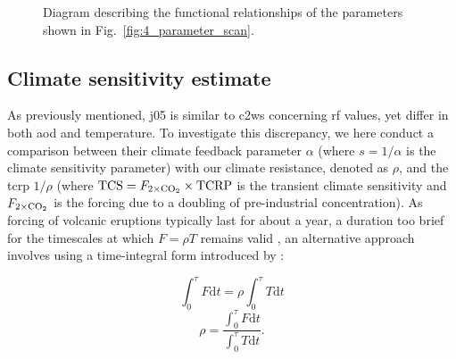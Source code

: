 \documentclass{ametsocV6.1}
\begin{document}
\begin{figure}
  \centering


  \caption{Diagram describing the functional relationships of the parameters shown in
    Fig.~\ref{fig:4_parameter_scan}.}\label{fig:5_diagram_of_function_relations}%
\end{figure}

\subsection{Climate sensitivity estimate}

As previously mentioned, \gls{j05} is similar to \gls{c2ws} concerning \gls{rf} values,
yet differ in both \gls{aod} and temperature. To investigate this discrepancy, we here
conduct a comparison between their climate feedback parameter \(\alpha \) (where
\(s=1/\alpha \) is the climate sensitivity parameter) with our climate resistance,
denoted as \(\rho \), and the \gls{tcrp} \(1/\rho\) (where
\(\mathrm{TCS}=F_{2\times\ce{CO2}}\times \mathrm{TCRP}\) is the transient climate
sensitivity and \(F_{2\times\ce{CO2}}\) is the forcing due to a doubling of
pre-industrial  concentration). As forcing of volcanic eruptions typically last
for about a year, a duration too brief for the timescales at which \(F=\rho T\) remains
valid \citep{gregory2016}, an alternative approach involves using a time-integral form
introduced by \citet{merlis2014}:

\begin{equation}
  \int_0^{\tau}F \mathrm{d}t=\rho\int_{0}^{\tau}T \mathrm{d}t
  \label{eq:climate-resistance-orig}
\end{equation}
\begin{equation}
  \rho=\frac{\int_0^{\tau}F \mathrm{d}t}{\int_{0}^{\tau}T \mathrm{d}t}.
  \label{eq:climate-resistance}
\end{equation}
\end{document}
